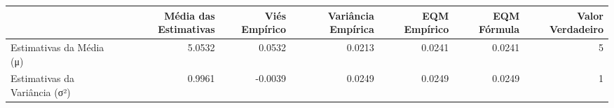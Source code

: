 \begin{tabular}{lrrrrrr}
\toprule
 & Média das Estimativas & Viés Empírico & Variância Empírica & EQM Empírico & EQM Fórmula & Valor Verdadeiro \\
\midrule
Estimativas da Média (μ) & 5.0532 & 0.0532 & 0.0213 & 0.0241 & 0.0241 & 5 \\
Estimativas da Variância (σ²) & 0.9961 & -0.0039 & 0.0249 & 0.0249 & 0.0249 & 1 \\
\bottomrule
\end{tabular}
